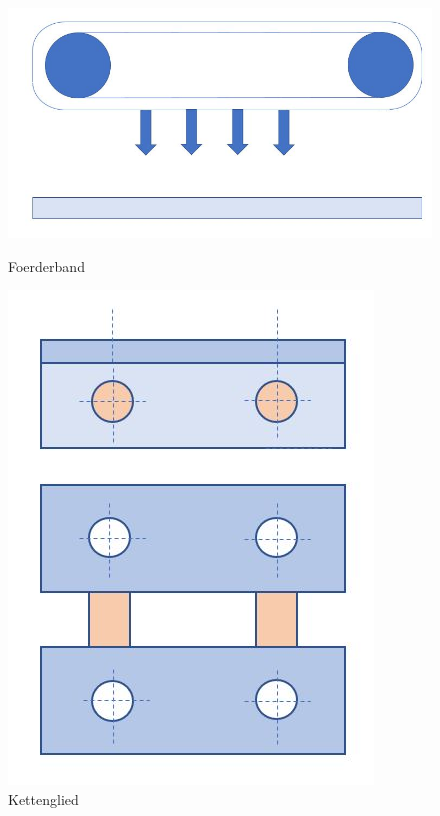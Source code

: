 \begin{figure}[H]
   \begin{minipage}[hbt]{.3\linewidth} %
      \includegraphics[width=\linewidth]{Bilder/Powerpoint/Foerderband}
      \caption{Foerderband}
      \label{Foerderband}
   \end{minipage}
   \hspace{.3\linewidth}%
   \begin{minipage}[hbt]{.3\linewidth} %
      \includegraphics[width=\linewidth]{Bilder/Powerpoint/Kettenglied}
      \caption{Kettenglied}
	  \label{Kettenglied}      
      \end{minipage}
\end{figure}

